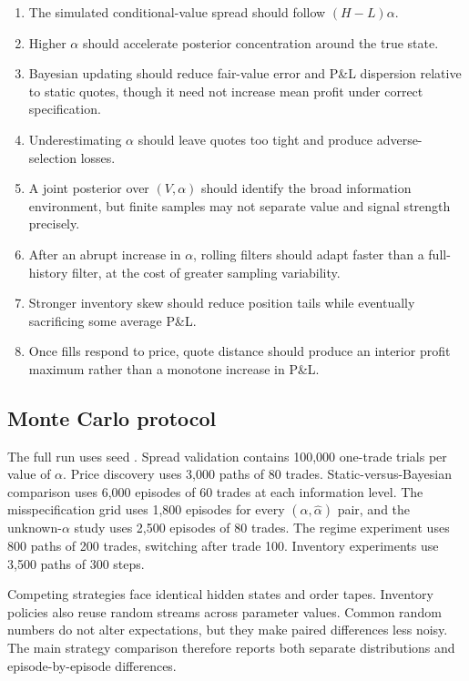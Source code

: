 \documentclass[11pt]{article}
\begin{document}
\begin{enumerate}[label=H\arabic*.]
\item The simulated conditional-value spread should follow $(H-L)\alpha$.
\item Higher $\alpha$ should accelerate posterior concentration around the true state.
\item Bayesian updating should reduce fair-value error and P\&L dispersion relative to static quotes, though it need not increase mean profit under correct specification.
\item Underestimating $\alpha$ should leave quotes too tight and produce adverse-selection losses.
\item A joint posterior over $(V,\alpha)$ should identify the broad information environment, but finite samples may not separate value and signal strength precisely.
\item After an abrupt increase in $\alpha$, rolling filters should adapt faster than a full-history filter, at the cost of greater sampling variability.
\item Stronger inventory skew should reduce position tails while eventually sacrificing some average P\&L.
\item Once fills respond to price, quote distance should produce an interior profit maximum rather than a monotone increase in P\&L.
\end{enumerate}

\subsection{Monte Carlo protocol}

The full run uses seed \ResultsSeed. Spread validation contains 100,000 one-trade trials per value of $\alpha$. Price discovery uses 3,000 paths of 80 trades. Static-versus-Bayesian comparison uses 6,000 episodes of 60 trades at each information level. The misspecification grid uses 1,800 episodes for every $(\alpha,\widehat{\alpha})$ pair, and the unknown-$\alpha$ study uses 2,500 episodes of 80 trades. The regime experiment uses 800 paths of 200 trades, switching after trade 100. Inventory experiments use 3,500 paths of 300 steps.

Competing strategies face identical hidden states and order tapes. Inventory policies also reuse random streams across parameter values. Common random numbers do not alter expectations, but they make paired differences less noisy. The main strategy comparison therefore reports both separate distributions and episode-by-episode differences.
\end{document}
